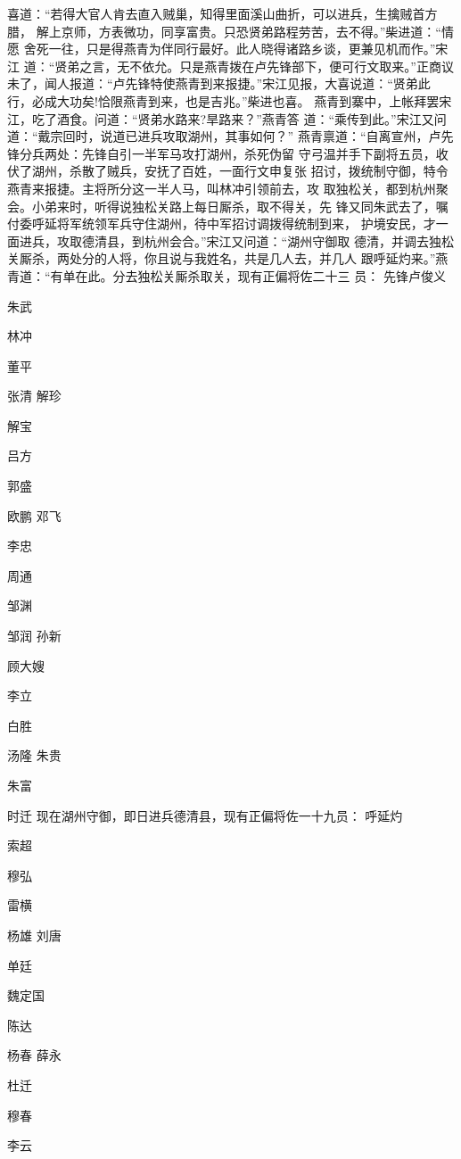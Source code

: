 喜道：“若得大官人肯去直入贼巢，知得里面溪山曲折，可以进兵，生擒贼首方腊，
解上京师，方表微功，同享富贵。只恐贤弟路程劳苦，去不得。”柴进道：“情愿
舍死一往，只是得燕青为伴同行最好。此人晓得诸路乡谈，更兼见机而作。”宋江
道：“贤弟之言，无不依允。只是燕青拨在卢先锋部下，便可行文取来。”正商议
未了，闻人报道：“卢先锋特使燕青到来报捷。”宋江见报，大喜说道：“贤弟此
行，必成大功矣!恰限燕青到来，也是吉兆。”柴进也喜。
燕青到寨中，上帐拜罢宋江，吃了酒食。问道：“贤弟水路来?旱路来？”燕青答
道：“乘传到此。”宋江又问道：“戴宗回时，说道已进兵攻取湖州，其事如何？”
燕青禀道：“自离宣州，卢先锋分兵两处：先锋自引一半军马攻打湖州，杀死伪留
守弓温并手下副将五员，收伏了湖州，杀散了贼兵，安抚了百姓，一面行文申复张
招讨，拨统制守御，特令燕青来报捷。主将所分这一半人马，叫林冲引领前去，攻
取独松关，都到杭州聚会。小弟来时，听得说独松关路上每日厮杀，取不得关，先
锋又同朱武去了，嘱付委呼延将军统领军兵守住湖州，待中军招讨调拨得统制到来，
护境安民，才一面进兵，攻取德清县，到杭州会合。”宋江又问道：“湖州守御取
德清，并调去独松关厮杀，两处分的人将，你且说与我姓名，共是几人去，并几人
跟呼延灼来。”燕青道：“有单在此。分去独松关厮杀取关，现有正偏将佐二十三
员：
先锋卢俊义

朱武

林冲

董平

张清
解珍

解宝

吕方

郭盛

欧鹏
邓飞

李忠

周通

邹渊

邹润
孙新

顾大嫂

李立

白胜

汤隆
朱贵

朱富

时迁
现在湖州守御，即日进兵德清县，现有正偏将佐一十九员：
呼延灼

索超

穆弘

雷横

杨雄
刘唐

单廷

魏定国

陈达

杨春
薛永

杜迁

穆春

李云

